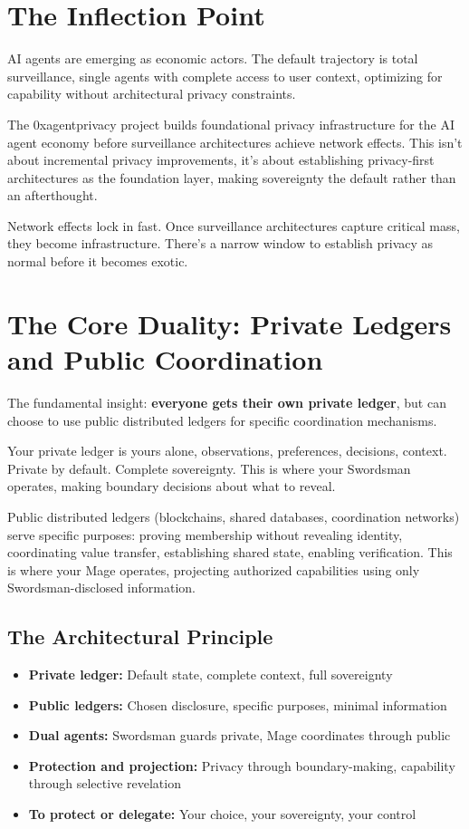 \documentclass[11pt,a4paper]{article}
\theoremstyle{definition}
\begin{document}
\section{The Inflection Point}

AI agents are emerging as economic actors. The default trajectory is total surveillance, single agents with complete access to user context, optimizing for capability without architectural privacy constraints.

The 0xagentprivacy project builds foundational privacy infrastructure for the AI agent economy before surveillance architectures achieve network effects. This isn't about incremental privacy improvements, it's about establishing privacy-first architectures as the foundation layer, making sovereignty the default rather than an afterthought.

Network effects lock in fast. Once surveillance architectures capture critical mass, they become infrastructure. There's a narrow window to establish privacy as normal before it becomes exotic.

\section{The Core Duality: Private Ledgers and Public Coordination}

The fundamental insight: \textbf{everyone gets their own private ledger}, but can choose to use public distributed ledgers for specific coordination mechanisms.

Your private ledger is yours alone, observations, preferences, decisions, context. Private by default. Complete sovereignty. This is where your Swordsman operates, making boundary decisions about what to reveal.

Public distributed ledgers (blockchains, shared databases, coordination networks) serve specific purposes: proving membership without revealing identity, coordinating value transfer, establishing shared state, enabling verification. This is where your Mage operates, projecting authorized capabilities using only Swordsman-disclosed information.

\subsection{The Architectural Principle}

\begin{itemize}
    \item \textbf{Private ledger:} Default state, complete context, full sovereignty
    \item \textbf{Public ledgers:} Chosen disclosure, specific purposes, minimal information
    \item \textbf{Dual agents:} Swordsman guards private, Mage coordinates through public
    \item \textbf{Protection and projection:} Privacy through boundary-making, capability through selective revelation
    \item \textbf{To protect or delegate:} Your choice, your sovereignty, your control
\end{itemize}
\end{document}
